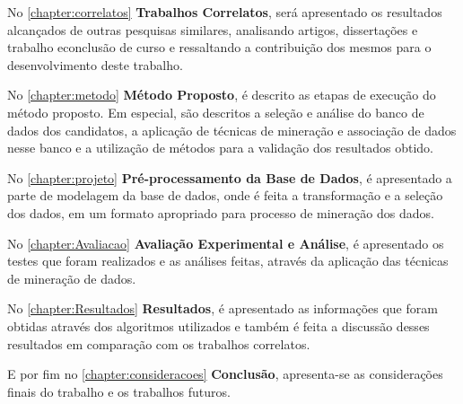 \par
No \autoref{chapter:correlatos} \textbf{Trabalhos Correlatos}, será apresentado os resultados alcançados de outras pesquisas similares, analisando artigos, dissertações e trabalho econclusão de curso e ressaltando a contribuição dos mesmos para o desenvolvimento deste trabalho.

\par
No \autoref{chapter:metodo} \textbf{Método Proposto}, é descrito as etapas de execução do método proposto. Em especial, são descritos a seleção e análise do banco de dados dos candidatos, a aplicação de técnicas de mineração e associação de dados nesse banco e a utilização de métodos para a validação dos resultados obtido.

\par
No \autoref{chapter:projeto} \textbf{Pré-processamento da Base de Dados}, é apresentado a parte de modelagem da base de dados, onde é feita a transformação e a seleção dos dados, em um formato apropriado para processo de mineração dos dados.

\par
No \autoref{chapter:Avaliacao} \textbf{Avaliação Experimental e Análise}, é apresentado os testes que foram realizados e as análises feitas, através da aplicação das técnicas de mineração de dados. 

\par
No \autoref{chapter:Resultados} \textbf{Resultados}, é apresentado as informações que foram obtidas através dos algoritmos utilizados e também é feita a discussão desses resultados em comparação com os trabalhos correlatos.

\par
E por fim no \autoref{chapter:consideracoes} \textbf{Conclusão}, apresenta-se as considerações finais do trabalho e os trabalhos futuros. 
